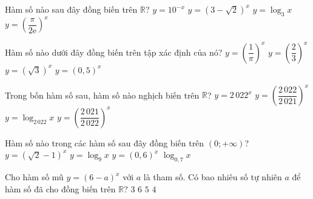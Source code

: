 \begin{ex}%
	Hàm số nào sau đây  đồng biến trên $\mathbb{R}$?
	\choice 
		 {$y=10^{-x}$}
		{\True $y=\left(3-\sqrt{2}\right)^x$} 
		 {$y=\log_3x$}
		 {$y=\left(\dfrac{\pi}{2\mathrm{e}}\right)^x$}
\end{ex}

\begin{ex}%
	Hàm số nào dưới đây đồng biến trên tập xác định của  nó?
	\choice 
		 {$y=\left(\dfrac{1}{\pi}\right)^x$}
		 {$y=\left(\dfrac{2}{3}\right)^x$}
		{\True $y=\left(\sqrt{3}\right)^x$} 
		 {$y=\left(0{,}5\right)^x$}
\end{ex}

\begin{ex}%
	Trong bốn  hàm số sau, hàm số nào nghịch biến trên $\mathbb{R}$?
	 \choice
		{$y=2\,022^x$} 
		 {$y=\left(\dfrac{2\,022}{2\,021} \right)^x$}
		 {$y=\log_{2\,022} x$}
		{\True $y=\left(\dfrac{2\,021}{2\,022}  \right)^x$}
\end{ex}

\begin{ex}%
	Hàm số  nào trong các hàm số sau đây đồng biến trên $(0;+\infty)$?
	\choice 
		{$y=\left(\sqrt{2}-1\right)^x$} 
		{\True $y=\log_9  x$}
		{$y=\left(0{,}6\right)^x$} 
		{$\log_{0{,}7}x$} 
\end{ex}

\begin{ex}%
	Cho hàm số mũ $y=\left(6-a\right)^x$ với $a$ là tham  số. Có bao nhiêu số tự nhiên $a$ để hàm số đã cho đồng biến trên $\mathbb{R}$?
	\choice 
		{$3$} 
		{$6$} 
		 {\True $5$}
		{$4$} 
\end{ex}

